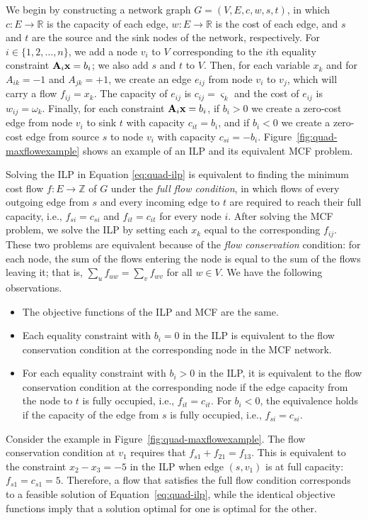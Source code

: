 We begin by constructing a network graph $G = (V, E, c, w, s, t)$, in which $c: E \to \mathbb{R}$ is the capacity of each edge, $w: E \to \mathbb{R}$ is the cost of each edge, and $s$ and $t$ are the source and the sink nodes of the network, respectively.  For $i \in \{1, 2, \dots, n\}$, we add a node $v_i$ to $V$ corresponding to the $i$th equality constraint $\mathbf{A}_i \mathbf{x} = b_i$; we also add $s$ and $t$ to $V$. Then, for each variable $x_k$ and for $A_{ik}=-1$ and $A_{jk}=+1$, we create an edge $e_{ij}$ from node $v_i$ to $v_j$, which will carry a flow $f_{ij} = x_k$. The capacity of $e_{ij}$ is $c_{ij}=\varsigma_k$ and the cost of $e_{ij}$ is $w_{ij} = \omega_k$.  Finally, for each constraint $\mathbf{A}_i \mathbf{x} = b_i$, if $b_i>0$ we create a zero-cost edge from node $v_i$ to sink $t$ with capacity $c_{it}=b_i$, and if $b_i<0$ we create a zero-cost edge from source $s$ to node $v_i$ with capacity $c_{si}=-b_i$. Figure~\ref{fig:quad-maxflowexample} shows an example of an ILP and its equivalent MCF problem.

Solving the ILP in Equation \eqref{eq:quad-ilp} is equivalent to finding the minimum cost flow $f: E \to \mathbb{Z}$ of $G$ under the \emph{full flow condition}, in which flows of every outgoing edge from $s$ and every incoming edge to $t$ are required to reach their full capacity, i.e., $f_{si}=c_{si}$ and $f_{it}=c_{it}$ for every node $i$. After solving the MCF problem, we solve the ILP by setting each $x_k$ equal to the corresponding $f_{ij}$. These two problems are equivalent because of the \emph{flow conservation} condition: for each node, the sum of the flows entering the node is equal to the sum of the flows leaving it; that is, $\sum_{u} f_{uw}=\sum_v f_{wv}$ for all $w \in V$.  We have the following observations.
\begin{itemize}
\item The objective functions of the ILP and MCF are the same.
\item Each equality constraint with $b_i=0$ in the ILP is equivalent to the flow conservation condition at the corresponding node in the MCF network.
\item For each equality constraint with $b_i>0$ in the ILP, it is equivalent to the flow conservation condition at the corresponding node if the edge capacity from the node to $t$ is fully occupied, i.e., $f_{it}=c_{it}$. For $b_i<0$, the equivalence holds if the capacity of the edge from $s$ is fully occupied, i.e., $f_{si}=c_{si}$. 
\end{itemize}
Consider the example in Figure~\ref{fig:quad-maxflowexample}. The flow conservation condition at $v_1$ requires that $f_{s1} + f_{21} = f_{13}$. This is equivalent to the constraint $x_2 - x_3 = -5$ in the ILP when edge $(s, v_1)$ is at full capacity: $f_{s1} = c_{s1} = 5$. Therefore, a flow that satisfies the full flow condition corresponds to a feasible solution of Equation~\eqref{eq:quad-ilp}, while the identical objective functions imply that a solution optimal for one is optimal for the other.

